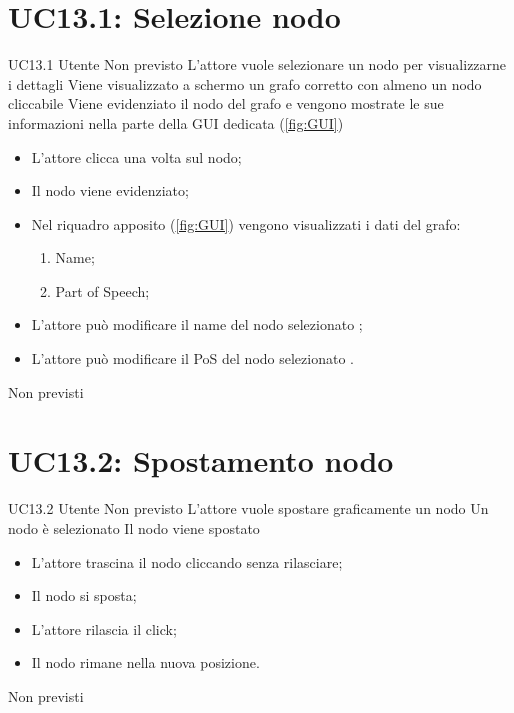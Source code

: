 \documentclass[../AnalisideiRequisiti.tex]{subfiles}
\begin{document}
\section{UC13.1: Selezione nodo}
\UserCase
{UC13.1}
{Utente}
{Non previsto}
{L'attore vuole selezionare un nodo per visualizzarne i dettagli}
{Viene visualizzato a schermo un grafo corretto con almeno un nodo cliccabile }
{Viene evidenziato il nodo del grafo e vengono mostrate le sue informazioni nella parte della GUI dedicata (\ref{fig:GUI})}
{
	\begin{itemize}
		\item{} L'attore clicca una volta sul nodo;
		\item{} Il nodo viene evidenziato;
		\item{} Nel riquadro apposito (\ref{fig:GUI}) vengono visualizzati i dati del grafo:
		\begin{enumerate}
			\item{} Name;
			\item{} Part of Speech;
		\end{enumerate}
		\item{} L'attore può modificare il name del nodo selezionato ;
		\item{} L'attore può modificare il PoS del nodo selezionato .
	\end{itemize}
}
{Non previsti}

\section{UC13.2: Spostamento nodo}
\UserCase
{UC13.2}
{Utente}
{Non previsto}
{L'attore vuole spostare graficamente un nodo}
{Un nodo è selezionato }
{Il nodo viene spostato}
{
	\begin{itemize}
		\item{} L'attore trascina il nodo cliccando senza rilasciare;
		\item{} Il nodo si sposta;
		\item{} L'attore rilascia il click;
		\item{} Il nodo rimane nella nuova posizione.
	\end{itemize}
}
{Non previsti}
\end{document}
